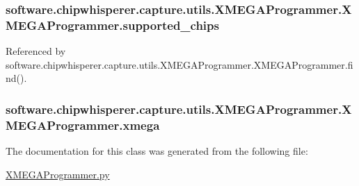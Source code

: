 \subsubsection[{supported\+\_\+chips}]{\setlength{\rightskip}{0pt plus 5cm}software.\+chipwhisperer.\+capture.\+utils.\+X\+M\+E\+G\+A\+Programmer.\+X\+M\+E\+G\+A\+Programmer.\+supported\+\_\+chips}\label{classsoftware_1_1chipwhisperer_1_1capture_1_1utils_1_1XMEGAProgrammer_1_1XMEGAProgrammer_a610d9b89854c02765d662473d30b9f30}


Referenced by software.\+chipwhisperer.\+capture.\+utils.\+X\+M\+E\+G\+A\+Programmer.\+X\+M\+E\+G\+A\+Programmer.\+find().

\hypertarget{classsoftware_1_1chipwhisperer_1_1capture_1_1utils_1_1XMEGAProgrammer_1_1XMEGAProgrammer_a0c2c0d2521983b93c89989b13e3add4e}{}
\subsubsection[{xmega}]{\setlength{\rightskip}{0pt plus 5cm}software.\+chipwhisperer.\+capture.\+utils.\+X\+M\+E\+G\+A\+Programmer.\+X\+M\+E\+G\+A\+Programmer.\+xmega}\label{classsoftware_1_1chipwhisperer_1_1capture_1_1utils_1_1XMEGAProgrammer_1_1XMEGAProgrammer_a0c2c0d2521983b93c89989b13e3add4e}


The documentation for this class was generated from the following file\+:\begin{DoxyCompactItemize}
\item 
\hyperlink{XMEGAProgrammer_8py}{X\+M\+E\+G\+A\+Programmer.\+py}\end{DoxyCompactItemize}
